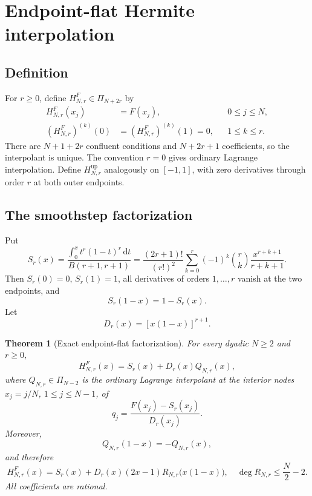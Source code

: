 \documentclass[11pt,oneside]{article}
\newtheorem{theorem}{Theorem}[section]
\theoremstyle{definition}
\theoremstyle{remark}
\newcommand{\Up}{\operatorname{up}}
\newcommand{\dd}{\,\mathrm d}
\begin{document}
\section{Endpoint-flat Hermite interpolation}
\label{sec:endpoint-hermite}

\subsection{Definition}

For $r\ge0$, define $H^F_{N,r}\in\Pi_{N+2r}$ by
\begin{align}
 H^F_{N,r}(x_j)&=F(x_j),&&0\le j\le N,
 \label{eq:HF-values}\\
 (H^F_{N,r})^{(k)}(0)&=(H^F_{N,r})^{(k)}(1)=0,
 &&1\le k\le r.
 \label{eq:HF-jets}
\end{align}
There are $N+1+2r$ confluent conditions and $N+2r+1$ coefficients, so the interpolant is
unique.  The convention $r=0$ gives ordinary Lagrange interpolation.  Define
$H^{\Up}_{N,r}$ analogously on $[-1,1]$, with zero derivatives through order $r$ at both
outer endpoints.

\subsection{The smoothstep factorization}

Put
\begin{equation}
 S_r(x)=\frac{\displaystyle\int_0^x t^r(1-t)^r\dd t}
 {B(r+1,r+1)}
 =\frac{(2r+1)!}{(r!)^2}
 \sum_{k=0}^{r}(-1)^k\binom rk\frac{x^{r+k+1}}{r+k+1}.
 \label{eq:smoothstep}
\end{equation}
Then $S_r(0)=0$, $S_r(1)=1$, all derivatives of orders $1,\ldots,r$ vanish at the two
endpoints, and
\begin{equation}
 S_r(1-x)=1-S_r(x).
 \label{eq:smoothstep-symmetry}
\end{equation}
Let
\begin{equation}
 D_r(x)=[x(1-x)]^{r+1}.
 \label{eq:Dr}
\end{equation}

\begin{theorem}[Exact endpoint-flat factorization]
\label{thm:factorization}
For every dyadic $N\ge2$ and $r\ge0$,
\begin{equation}
 \boxed{H^F_{N,r}(x)=S_r(x)+D_r(x)Q_{N,r}(x),}
 \label{eq:HF-factor}
\end{equation}
where $Q_{N,r}\in\Pi_{N-2}$ is the ordinary Lagrange interpolant at the interior nodes
$x_j=j/N$, $1\le j\le N-1$, of
\begin{equation}
 q_j=\frac{F(x_j)-S_r(x_j)}{D_r(x_j)}.
 \label{eq:qj-F}
\end{equation}
Moreover,
\begin{equation}
 Q_{N,r}(1-x)=-Q_{N,r}(x),
 \label{eq:Q-antisym}
\end{equation}
and therefore
\begin{equation}
 H^F_{N,r}(x)=S_r(x)+D_r(x)(2x-1)
 R_{N,r}\bigl(x(1-x)\bigr),
 \quad \deg R_{N,r}\le \frac N2-2.
 \label{eq:HF-compressed}
\end{equation}
All coefficients are rational.
\end{theorem}
\end{document}
